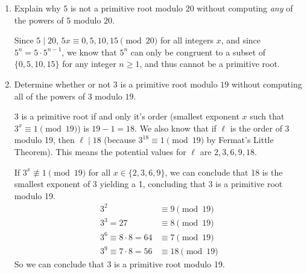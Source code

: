 \documentclass[11pt]{article}
\begin{document}
\begin{enumerate}
\item Explain why $5$ is not a primitive root modulo $20$ without computing \emph{any} of the powers of $5$ modulo $20$. 

  Since \(5 \mid 20\), \(5x \equiv 0,5,10,15 \pmod{20}\) for all integers \(x\), and since \(5^n = 5 \cdot 5^{n-1}\), we know that \(5^n\) can only be congruent to a subset of \(\{0,5,10,15\}\) for any integer \(n \geq 1\), and thus cannot be a primitive root.

\item Determine whether or not $3$ is a primitive root modulo $19$ without computing all of the powers of $3$ modulo $19$. 

  3 is a primitive root if and only it's order (smallest exponent \(x\) such that \(3^x \equiv 1 \pmod{19}\)) is \(19-1 = 18\).  We also know that if \(\ell\) is the order of 3 modulo 19, then \(\ell \mid 18\) (because \(3^{18} \equiv 1 \pmod{19}\) by Fermat's Little Theorem).  This means the potential values for \(\ell\) are \(2,3,6,9,18\). 

  If \(3^x \not\equiv 1 \pmod{19}\) for all \(x \in \{2,3,6,9\}\), we can conclude that 18 is the smallest exponent of 3 yielding a 1, concluding that 3 is a primitive root modulo 19.
  \begin{align*}
    3^2 &\equiv 9 \pmod{19} \\
    3^3 = 27 &\equiv 8 \pmod{19} \\
    3^6 \equiv 8 \cdot 8 = 64 &\equiv 7 \pmod{19} \\
    3^9 \equiv 7 \cdot 8 = 56 &\equiv 18 \pmod{19}
  \end{align*}
  So we can conclude that 3 is a primitive root modulo 19.
\end{enumerate}
\end{document}
